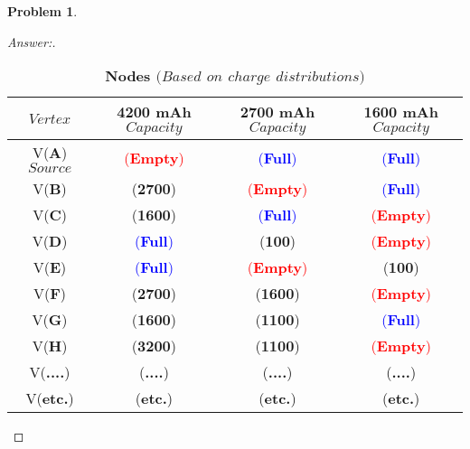\documentclass[11pt]{article}
\theoremstyle{definition}
\theoremstyle{definition}
\newtheorem{required}{Problem}
\theoremstyle{definition}
\begin{document}
\begin{required}
\begin{enumerate}[label=(\alph*)]
\begin{proof}[Answer:]
	\begin{table}[ht]
		\caption{\textbf{Nodes $(Based$ $on$ $charge$ $distributions)$}}
		\centering
		\begin{tabular}{|c|c|c|c|}
			\hline
			$Vertex$  & \textbf{4200 mAh $Capacity$} & \textbf{2700 mAh $Capacity$} & \textbf{1600 mAh $Capacity$} \\  [0.5ex]
			\hline 
			V(\textbf{A}) $Source$ & \textcolor{red}{(\textbf{Empty})} & \textcolor{blue}{(\textbf{Full})} & \textcolor{blue}{(\textbf{Full})} \\ 
			\hline 
			V(\textbf{B}) & (\textbf{2700}) & \textcolor{red}{(\textbf{Empty})} & \textcolor{blue}{(\textbf{Full})} \\ 
			\hline
			V(\textbf{C}) & (\textbf{1600}) & \textcolor{blue}{(\textbf{Full})} & \textcolor{red}{(\textbf{Empty})} \\ 
			\hline 
			V(\textbf{D}) & \textcolor{blue}{(\textbf{Full})} & (\textbf{100}) & \textcolor{red}{(\textbf{Empty})} \\ 
			\hline 
			V(\textbf{E}) & \textcolor{blue}{(\textbf{Full})} & \textcolor{red}{(\textbf{Empty})} & (\textbf{100}) \\ 
			\hline
			V(\textbf{F}) & (\textbf{2700}) & (\textbf{1600}) & \textcolor{red}{(\textbf{Empty})} \\ 
			\hline
			V(\textbf{G}) & (\textbf{1600}) & (\textbf{1100}) & \textcolor{blue}{(\textbf{Full})} \\ 
			\hline
			V(\textbf{H}) & (\textbf{3200}) & (\textbf{1100}) & \textcolor{red}{(\textbf{Empty})} \\ 
			\hline
			V(\textbf{....}) & (\textbf{....}) & (\textbf{....}) & (\textbf{....}) \\ 
			\hline
			V(\textbf{etc.}) & (\textbf{etc.}) & (\textbf{etc.}) & (\textbf{etc.}) \\ 
			\hline
		\end{tabular} 
        \label{table:nonlin}
	\end{table}	
	

\end{proof}
\end{enumerate}
\end{required}
\end{document}
